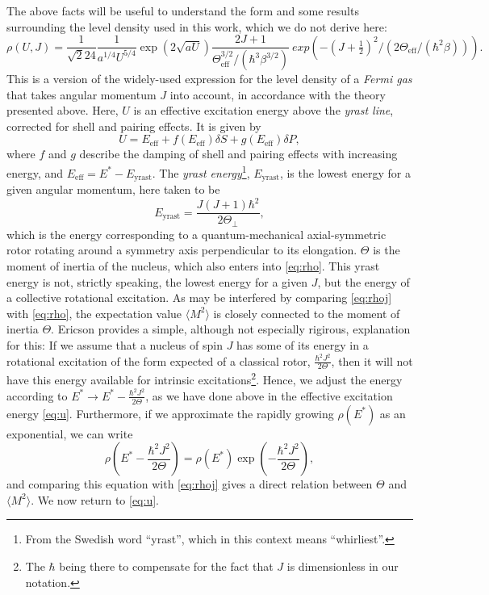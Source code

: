 The above facts will be useful to understand the form and some results surrounding the level density used in this work, which we do not derive here:
\begin{equation}
\rho(U,J) = \frac{1}{\sqrt{2}24}
\frac{1}{a^{1/4} U^{5/4}} \exp{(2\sqrt{aU})}
\frac{2J+1}{\Theta_\text{eff}^{3/2}/(\hbar^3\beta^{3/2})}\ exp{\left(-(J+\tfrac{1}{2})^2/(2\Theta_\text{eff}/(\hbar^2\beta))\right)}.\label{eq:rho}
\end{equation}
This is a version of the widely-used expression for the level density of a \emph{Fermi gas} that takes angular momentum $J$ into account, in accordance with the theory presented above\cite{ripl:2006}. 
Here, $U$ is an effective excitation energy above the \emph{yrast line}, corrected for shell and pairing effects. It is given by
\begin{equation}
U=E_\text{eff} + f(E_\text{eff})\delta S + g(E_\text{eff})\delta P,\label{eq:u}
\end{equation}
where $f$ and $g$ describe the damping of shell and pairing effects with increasing energy, and $E_\text{eff} = E^*-E_\text{yrast}$. The \emph{yrast energy}\footnote{From the Swedish word ``yrast'', which in this context means ``whirliest''\cite{yrast}.}, $E_\text{yrast}$, is the lowest energy for a given angular momentum, here taken to be
\begin{equation}
E_\text{yrast} = \frac{J(J+1)\hbar^2}{2\Theta_\perp},
\end{equation}
which is the energy corresponding to a quantum-mechanical axial-symmetric rotor rotating around a symmetry axis perpendicular to its elongation. $\Theta$ is the moment of inertia of the nucleus, which also enters into \eqref{eq:rho}. This yrast energy is not, strictly speaking, the lowest energy for a given $J$, but the energy of a collective rotational excitation\cite{ericson:1960}.
As may be interfered by comparing \eqref{eq:rhoj} with \eqref{eq:rho}, the expectation value $\langle M^2 \rangle$ is closely connected to the moment of inertia $\Theta$.
Ericson\cite{ericson:1960} provides a simple, although not especially rigirous, explanation for this:
If we assume that a nucleus of spin $J$ has some of its energy in a rotational excitation of the form expected of a classical rotor, $\frac{\hbar^2J^2}{2\Theta}$, then it will not have this energy available for intrinsic excitations\footnote{The $\hbar$ being there to compensate for the fact that $J$ is dimensionless in our notation.}. Hence, we adjust the energy according to $E^* \to E^* - \frac{\hbar^2J^2}{2\Theta}$, as we have done above in the effective excitation energy \eqref{eq:u}. Furthermore, if we approximate the rapidly growing $\rho(E^*)$ as an exponential, we can write
\begin{equation}
\rho(E^* - \frac{\hbar^2J^2}{2\Theta}) = \rho(E^*) \exp{(-\frac{\hbar^2J^2}{2\Theta})},
\end{equation}
and comparing this equation with \eqref{eq:rhoj} gives a direct relation between $\Theta$ and $\langle M^2 \rangle$. We now return to \autoref{eq:u}.
